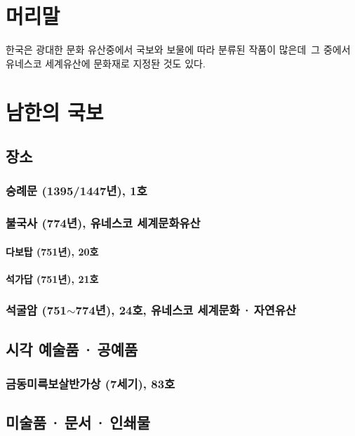 \documentclass[a4paper,11pt]{book}
\begin{document}


\chapter*{머리말}
한국은 광대한 문화 유산중에서 국보와 보물에 따라 분류된 작품이 많은데\,\cite{k1} 그 중에서 유네스코 세계유산에 문화재로 지정돤 것도 있다.\cite{k2}

\chapter{남한의 국보}
\section{장소}
\subsection{숭례문 (1395/1447년), 1호}
\subsection{불국사 (774년), 유네스코 세계문화유산}
\subsubsection{다보탑 (751년), 20호} 	%
\subsubsection{석가답 (751년), 21호} 	%
\subsection{석굴암 (751$\sim$774년), 24호, 유네스코 세계문화\,·\,자연유산}
\section{시각 예술품\,·\,공예품}
\subsection{금동미륵보살반가상 (7세기), 83호}
\section{미술품\,·\,문서\,·\,인쇄물}
\end{document}
